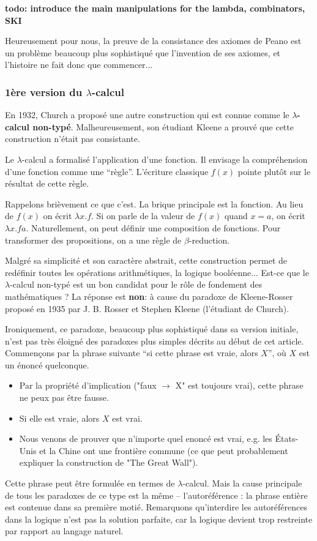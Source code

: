 \textbf{todo: introduce the main manipulations for the lambda, combinators, SKI}

Heureusement pour nous, la preuve de la consistance des axiomes de Peano est un problème beaucoup plus sophistiqué que l'invention de ses axiomes, et l'histoire ne fait donc que commencer...

\subsubsection*{1ère version du $\lambda$-calcul}
En 1932, Church a proposé une autre construction qui est connue comme le \textbf{$\lambda$-calcul non-typé}. Malheureusement, son étudiant Kleene a prouvé que cette construction n'était pas consistante.

Le $\lambda$-calcul a formalisé l'application d'une fonction. Il envisage la compréhension d'une fonction comme une ``règle''. L'écriture classique $f(x)$ pointe plutôt sur le résultat de cette règle.

Rappelons brièvement ce que c'est.
La brique principale est la fonction.
Au lieu de $f(x)$ on écrit $\lambda x.f$.
Si on parle de la valeur de $f(x)$ quand $x=a$, on écrit $\lambda x.f a$.
Naturellement, on peut définir une composition de fonctions.
Pour transformer des propositions, on a une règle de $\beta$-reduction.

Malgré sa simplicité et son caractère abstrait, cette construction permet de redéfinir toutes les opérations arithmétiques, la logique booléenne...
Est-ce que le $\lambda$-calcul non-typé est un bon candidat pour le rôle de fondement des mathématiques ?
La réponse est \textbf{non}: à cause du paradoxe de Kleene-Rosser proposé en 1935 par J. B. Rosser et Stephen Kleene (l'étudiant de Church).

Ironiquement, ce paradoxe, beaucoup plus sophistiqué dans sa version initiale, n'est pas très éloigné des paradoxes plus simples décrits au début de cet article.
Commençons par la phrase suivante ``si cette phrase est vraie, alors $X$'', où $X$ est un énoncé quelconque.
\begin{itemize}
	\item Par la propriété d'implication ("faux $\to$ X" est toujours vrai), cette phrase ne peux pas être fausse.
	\item Si elle est vraie, alors $X$ est vrai.
	\item Nous venons de prouver que n'importe quel enoncé est vrai, e.g. les États-Unis et la Chine ont une frontière commune (ce que peut probablement expliquer la construction de "The Great Wall").
\end{itemize}
Cette phrase peut être formulée en termes de $\lambda$-calcul.
Mais la cause principale de tous les paradoxes de ce type est la même -- l'autoréférence : la phrase entière est contenue dans sa première motié.
Remarquons qu'interdire les autoréférences dans la logique n'est pas la solution parfaite, car la logique devient trop restreinte par rapport au langage naturel.

